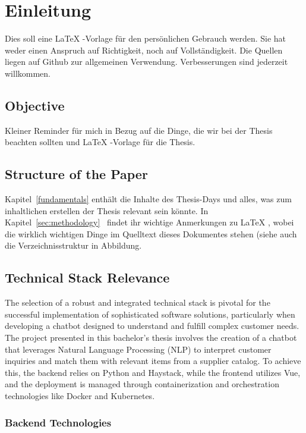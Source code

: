 \section{Einleitung}
Dies soll eine \LaTeX{}
-Vorlage für den persönlichen Gebrauch werden.
Sie hat weder einen Anspruch auf Richtigkeit, noch auf Vollständigkeit.
Die Quellen liegen auf Github zur allgemeinen Verwendung.
Verbesserungen sind jederzeit willkommen.

\subsection{Objective}
Kleiner Reminder für mich in Bezug auf die Dinge, die wir bei der Thesis beachten sollten und \LaTeX{}
-Vorlage für die Thesis.

\subsection{Structure of the Paper}
Kapitel~\ref{fundamentals}
enthält die Inhalte des Thesis-Days und alles, was zum inhaltlichen erstellen der Thesis relevant sein könnte.
In
Kapitel~\ref{sec:methodology}~ findet ihr wichtige Anmerkungen zu \LaTeX{}
, wobei die wirklich wichtigen Dinge im Quelltext dieses Dokumentes stehen (siehe auch die Verzeichnisstruktur in
Abbildung.

\subsection{Technical Stack Relevance}

The selection of a robust and integrated technical stack is pivotal for the successful implementation of sophisticated
software solutions, particularly when developing a chatbot designed to understand and fulfill complex customer needs.
The project presented in this bachelor’s thesis involves the creation of a chatbot that leverages Natural Language
Processing (\ac{NLP}) to interpret customer inquiries and match them with relevant items from a supplier catalog.
To achieve
this, the backend relies on Python and Haystack, while the frontend utilizes Vue, and the deployment is
managed through containerization and orchestration technologies like Docker and Kubernetes.

\subsubsection{Backend Technologies}

